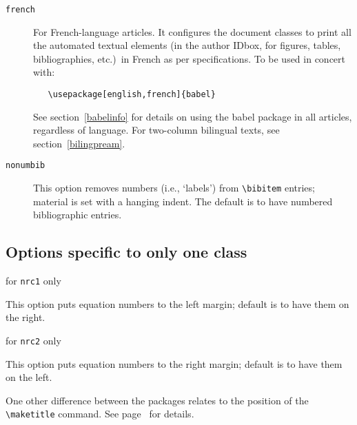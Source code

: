 \begin{description}
   \item [{\tt french}]

         For French-language articles.\label{frenchclassoption} It
         configures the \NRC{} document classes to print all the
         auto\-mated textual ele\-ments (in the author IDbox, for
         figures, tables, biblio\-graphies, etc.)\ in French as per
         \NRC{} speci\-fi\-cations. To be used in concert with:

\begin{verbatim}
   \usepackage[english,french]{babel}
\end{verbatim}

         See section~\ref{babelinfo} for details on using the
         \textsf{babel} package in all articles, regardless of
         language. For two-column bilingual texts, see
         section~\ref{bilingpream}.


   \item [{\tt nonumbib}] 

         This option removes numbers (i.e., `labels') from
         \verb|\bibitem| entries; material is set with a hanging
         indent. The default is to have numbered bibliographic
         entries.
\end{description}


\subsection{Options specific to only one class}

\begin{description} \itemsep=0pt
   \item [{\tt leqno}]  \hfill for \texttt{nrc1} only

         This option puts equation numbers to the left margin;
         default is to have them on the right.

   \item [{\tt reqno}] \hfill for \texttt{nrc2} only

         This option puts equation numbers to the right margin;
         default is to have them on the left.
\end{description}

\noindent One other difference between the packages relates to the
position of the \verb|\maketitle| command. See
page~\pageref{maketitle} for details.


